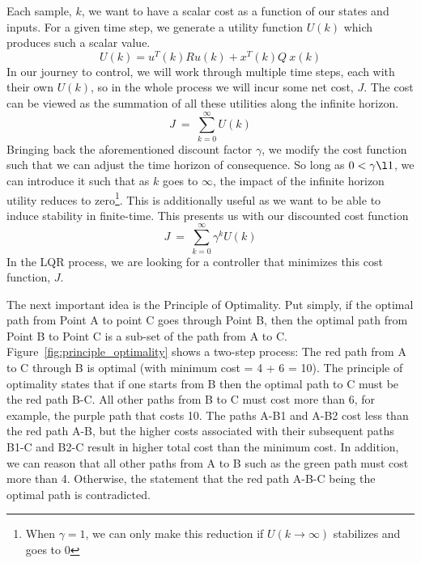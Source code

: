 Each sample, $k$, we want to have a scalar cost as a function of our states and inputs. For a given time step, we generate a utility function $U\left(k\right)$ which produces such a scalar value.
\begin{equation}
    U\left(k\right)=u^T\left(k\right)Ru\left(k\right)+x^T\left(k\right)Q\ x\left(k\right)
    \label{eq:utility_function}
\end{equation}
In our journey to control, we will work through multiple time steps, each with their own $U\left(k\right)$, so in the whole process we will incur some net cost, $J$. The cost can be viewed as the summation of all these utilities along the infinite horizon.
\begin{equation}
    J\ =\ \sum_{k=0}^{\infty}U\left(k\right)
    \label{eq:cost_function}
\end{equation}
Bringing back the aforementioned discount factor $\gamma$, we modify the cost function such that we can adjust the time horizon of consequence. So long as $0<\gamma \l 1$, we can introduce it such that as $k$ goes to $\infty$, the impact of the infinite horizon utility reduces to zero\footnote{When $\gamma = 1$, we can only make this reduction if $U(k \to \infty)$ stabilizes and goes to $0$}. This is additionally useful as we want to be able to induce stability in finite-time. This presents us with our discounted cost function
\begin{equation}
    J\ =\ \sum_{k=0}^{\infty}{\gamma ^k U\left(k\right)}
    \label{eq:discounted_cost_function}
\end{equation}
In the LQR process, we are looking for a controller that minimizes this cost function, $J$.

The next important idea is the Principle of Optimality. Put simply, if the optimal path from Point A to point C goes through Point B, then the optimal path from Point B to Point C is a sub-set of the path from A to C. Figure~\ref{fig:principle_optimality} shows a two-step process: The red path from A to C through B is optimal (with minimum cost = 4 + 6 = 10). The principle of optimality states that if one starts from B then the optimal path to C must be the red path B-C. All other paths from B to C must cost more than 6, for example, the purple path that costs 10. The paths A-B1 and A-B2 cost less than the red path A-B, but the higher costs associated with their subsequent paths B1-C and B2-C result in higher total cost than the minimum cost. In addition, we can reason that all other paths from A to B such as the green path must cost more than 4. Otherwise, the statement that the red path A-B-C being the optimal path is contradicted. 

